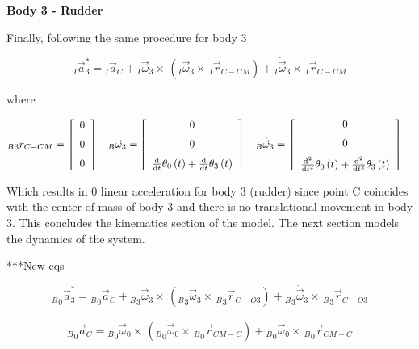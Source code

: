 \textbf{Body 3 - Rudder}

Finally, following the same procedure for body 3

\begin{equation}\label{aabody3}
_I\vec{a}_{3}^* = {_I}\vec{a}_{C}+ {_I}\vec{\omega}_{3}\times \,({_I}\vec{\omega}_{3}\times \,{_I}\vec{r}_{C-CM}) + {_I}\dot{\vec{\omega}}_{3}\times \,{_I}\vec{r}_{C-CM}
\end{equation}

where 

\begin{align*}
_B{_3}{r}_{C-CM} &= \left[ \begin {array}{c} 0\\ \noalign{\medskip}0\\ \noalign{\medskip}0
\end {array} \right]&
{_B}\vec{\omega}_{3} =& \left[ \begin {array}{c} 0\\ \noalign{\medskip}0\\ \noalign{\medskip}
{\frac {\rm d}{{\rm d}t}}\theta_{{0}} \left( t \right) +{\frac {\rm d}
{{\rm d}t}}\theta_{{3}} \left( t \right) \end {array} \right] 
&
{_B}\dot{\vec{\omega}}_{3} &=  \left[ \begin {array}{c} 0\\ \noalign{\medskip}0\\ \noalign{\medskip}
{\frac {{\rm d}^{2}}{{\rm d}{t}^{2}}}\theta_{{0}} \left( t \right) +{
\frac {{\rm d}^{2}}{{\rm d}{t}^{2}}}\theta_{{3}} \left( t \right) 
\end {array} \right] 
&
\end{align*}

Which results in 0 linear acceleration for body 3 (rudder) since point C coincides with the center of mass of body 3 and there is no translational movement in body 3. This concludes the kinematics section of the model. The next section models the dynamics of the system. 

***New eqs

\begin{equation}\label{aabody3a}
{_B}_{0}\vec{a}_{3}^* = {_B}_{0}\vec{a}_{C}+ {_B}_{3}\vec{\omega}_{3}\times \,({_B}_{3}\vec{\omega}_{3}\times \,{_B}_{3}\vec{r}_{C-O3}) + {_B}_{3}\dot{\vec{\omega}}_{3}\times \,{_B}_{3}\vec{r}_{C-O3}
\end{equation}

\begin{equation}\label{aabody3b}
{_B}_{0}\vec{a}_{C} = {_B}_{0}\vec{\omega}_{0}\times \,({_B}_{0}\vec{\omega}_{0}\times \,{_B}_{0}\vec{r}_{CM-C}) + {_B}_{0}\dot{\vec{\omega}}_{0}\times \,{_B}_{0}\vec{r}_{CM-C}
\end{equation}


